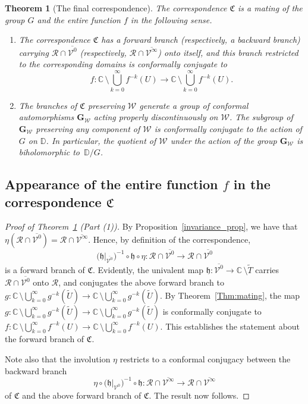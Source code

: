 \documentclass[11pt,a4paper, oneside]{amsart}
\newtheorem{thm}{Theorem}[section]
\theoremstyle{definition}
\theoremstyle{remark}
\numberwithin{equation}{section}
\def\D{{\mathbb{D}}}
\def\cV{\mathcal {V}}
\def\cW{\mathcal {W}}
\def\cR{\mathcal {R}}
\newcommand{\C}{\mathbb{C}}
\newcommand{\sm}{\setminus}
\renewcommand{\tilde}{\widetilde}
\begin{document}
\begin{thm}[The final correspondence] \label{corr_mating_thm}
The correspondence $\mathfrak{C}$ is a mating of the group $G$ and the entire function $f$ in the following sense.
\begin{enumerate}[leftmargin=8mm]
    \item The correspondence $\mathfrak{C}$ has a forward branch (respectively, a backward branch) carrying $\pmb{\cR}\cap \overline{\cV^0}$ (respectively, $\pmb{\cR}\cap \overline{\cV^\infty}$) onto itself, and this branch restricted to the corresponding domains is conformally conjugate to 
    \[
    f \colon \C \,\sm \bigcup_{k=0}^\infty f^{-k}(U) \to \C \,\sm \bigcup_{k=0}^\infty f^{-k}(U).
    \]
    
    \item The branches of $\mathfrak{C}$ preserving $\pmb{\cW}$ generate a group of conformal automorphisms $\pmb{G}_{\pmb{\cW}}$ acting properly discontinuously on $\pmb{\cW}$. The subgroup of $\pmb{G}_{\pmb{\cW}}$ preserving any component of $\pmb{\cW}$ is conformally conjugate to the action of $G$ on $\D$. In particular, the quotient of $\pmb{\cW}$ under the action of the group $\pmb{G}_{\pmb{\cW}}$ is biholomorphic to~$\mathbb{D}/G$.
\end{enumerate}
\end{thm}

\subsection{Appearance of the entire function $f$ in the correspondence $\mathfrak{C}$}\label{map_like_subsec} 


\begin{proof}[Proof of Theorem~\ref{corr_mating_thm} (Part (1))]
By Proposition~\ref{invariance_prop}, we have that $\eta(\pmb{\cR}\cap\overline{\cV^0})=\pmb{\cR}\cap\overline{\cV^\infty}$. Hence, by definition of the correspondence,
    $$
    \Big(\mathfrak{h}\big|_{\overline
    {\cV^0}}\Big)^{-1}\circ \mathfrak{h}\circ \eta: \pmb{\cR}\cap \overline{\cV^0}\rightarrow\pmb{\cR}\cap \overline{\cV^0}
    $$
    is a forward branch of $\mathfrak{C}$. Evidently, the univalent map $\mathfrak{h}: \overline{\cV^0}\rightarrow \C\,\sm\tilde T$ carries $\pmb{\cR}\cap \overline{\cV^0}$ onto $\cR$, and conjugates the above forward branch to $g \colon \C \,\sm \bigcup_{k=0}^\infty g^{-k}(\tilde U) \to \C \,\sm \bigcup_{k=0}^\infty g^{-k}(\tilde U)$. By Theorem~\ref{Thm:mating}, the map $g \colon \C \,\sm \bigcup_{k=0}^\infty g^{-k}(\tilde U) \to \C \,\sm \bigcup_{k=0}^\infty g^{-k}(\tilde U)$ is conformally conjugate to $f \colon \C \,\sm \bigcup_{k=0}^\infty f^{-k}(U) \to \C \,\sm \bigcup_{k=0}^\infty f^{-k}(U)$. This establishes the statement about the forward branch of $\mathfrak{C}$.

    Note also that the involution $\eta$ restricts to a conformal conjugacy between the backward branch  
    $$
    \eta\circ \Big(\mathfrak{h}\big|_{\cV^0}\Big)^{-1}\circ \mathfrak{h}: \pmb{\cR}\cap\overline{\cV^\infty} \rightarrow \pmb{\cR}\cap\overline{\cV^\infty}
    $$
    of $\mathfrak{C}$ and the above forward branch of $\mathfrak{C}$. The result now follows.
\end{proof}
\end{document}
